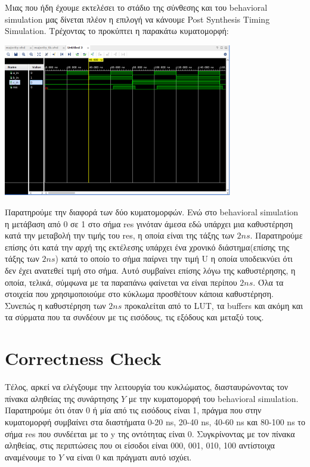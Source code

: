 \documentclass[]{article}
\begin{document}
Μιας που ήδη έχουμε εκτελέσει το στάδιο της σύνθεσης και του behavioral simulation μας δίνεται πλέον η επιλογή να κάνουμε Post Synthesis Timing Simulation.
Τρέχοντας το προκύπτει η παρακάτω κυματομορφή:
\begin{center}
	\includegraphics[width=10cm]{post_synthesis_timing.png}
\end{center}

Παρατηρούμε την διαφορά των δύο κυματομορφών. Ενώ στο behavioral simulation η μετάβαση από 0 σε 1 στο σήμα res γινόταν άμεσα εδώ
υπάρχει μια καθυστέρηση κατά την μεταβολή την τιμής του res, η οποία είναι της τάξης των $2ns$. Παρατηρούμε επίσης ότι κατά την αρχή
της εκτέλεσης υπάρχει ένα χρονικό διάστημα(επίσης της τάξης των $2ns$) κατά το οποίο το σήμα παίρνει την τιμή U η οποία υποδεικνύει ότι δεν έχει ανατεθεί τιμή στο σήμα.
Αυτό συμβαίνει επίσης λόγω της καθυστέρησης, η οποία, τελικά, σύμφωνα με τα παραπάνω φαίνεται να είναι περίπου $2ns$.
Όλα τα στοιχεία που χρησιμοποιούμε στο κύκλωμα προσθέτουν κάποια καθυστέρηση. Συνεπώς η καθυστέρηση των $2ns$ προκαλείται από το LUT, τα buffers και ακόμη και τα σύρματα που τα συνδέουν με τις εισόδους, τις εξόδους και μεταξύ τους.

\section{Correctness Check}
Τέλος, αρκεί να ελέγξουμε την λειτουργία του κυκλώματος, διασταυρώνοντας τον πίνακα αληθείας της συνάρτησης $Y$ με την κυματομορφή του behavioral simulation.
Παρατηρούμε ότι όταν 0 ή μία από τις εισόδους είναι 1, πράγμα που στην κυματομορφή συμβαίνει στα διαστήματα 0-20 ns, 20-40 ns, 40-60 ns και 80-100 ns το σήμα res που συνδέεται με το y της οντότητας είναι 0.
Συγκρίνοντας με τον πίνακα αληθείας, στις περιπτώσεις που οι είσοδοι είναι 000, 001, 010, 100 αντίστοιχα αναμένουμε το $Y$ να είναι 0 και πράγματι αυτό ισχύει.
\end{document}
